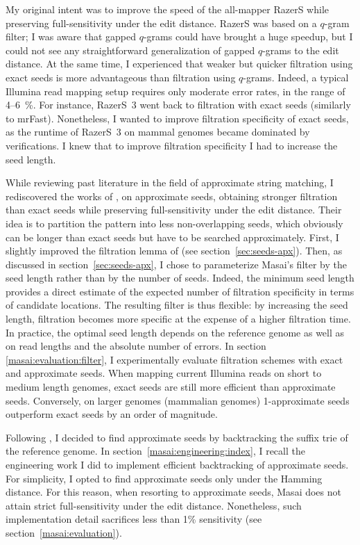 My original intent was to improve the speed of the all-mapper RazerS \citep{Weese2009} while preserving full-sensitivity under the edit distance.
RazerS was based on a $q$-gram filter;
I was aware that gapped $q$-grams could have brought a huge speedup, but I could not see any straightforward generalization of gapped $q$-grams to the edit distance.
At the same time, I experienced that weaker but quicker filtration using exact seeds is more advantageous than filtration using $q$-grams.
Indeed, a typical Illumina read mapping setup requires only moderate error rates, in the range of 4--6~\%.
For instance, RazerS~3 \citep{Weese2012} went back to filtration with exact seeds (similarly to mrFast).
Nonetheless, I wanted to improve filtration specificity of exact seeds, as the runtime of RazerS~3 on mammal genomes became dominated by verifications.
I knew that to improve filtration specificity I had to increase the seed length.

While reviewing past literature in the field of approximate string matching, I rediscovered the works of \citeauthor{Myers1994}, \citeauthor{Navarro2000} on approximate seeds, obtaining stronger filtration than exact seeds while preserving full-sensitivity under the edit distance.
Their idea is to partition the pattern into less non-overlapping seeds, which obviously can be longer than exact seeds but have to be searched approximately.
First, I slightly improved the filtration lemma of \citep{Navarro2000} (see section~\ref{sec:seeds-apx}).
Then, as discussed in section~\ref{sec:seeds-apx}, I chose to parameterize Masai's filter by the seed length rather than by the number of seeds.
Indeed, the minimum seed length provides a direct estimate of the expected number of filtration specificity in terms of candidate locations.
The resulting filter is thus flexible: by increasing the seed length, filtration becomes more specific at the expense of a higher filtration time.
In practice, the optimal seed length depends on the reference genome as well as on read lengths and the absolute number of errors.
In section \ref{masai:evaluation:filter}, I experimentally evaluate filtration schemes with exact and approximate seeds.
When mapping current Illumina reads on short to medium length genomes, exact seeds are still more efficient than approximate seeds.
Conversely, on larger genomes (\eg mammalian genomes) 1-approximate seeds outperform exact seeds by an order of magnitude.

Following \citep{Navarro2000}, I decided to find approximate seeds by backtracking the suffix trie of the reference genome.
In section~\ref{masai:engineering:index}, I recall the engineering work I did to implement efficient backtracking of approximate seeds.
For simplicity, I opted to find approximate seeds only under the Hamming distance.
For this reason, when resorting to approximate seeds, Masai does not attain strict full-sensitivity under the edit distance.
Nonetheless, such implementation detail sacrifices less than 1\% sensitivity (see section~\ref{masai:evaluation}).

